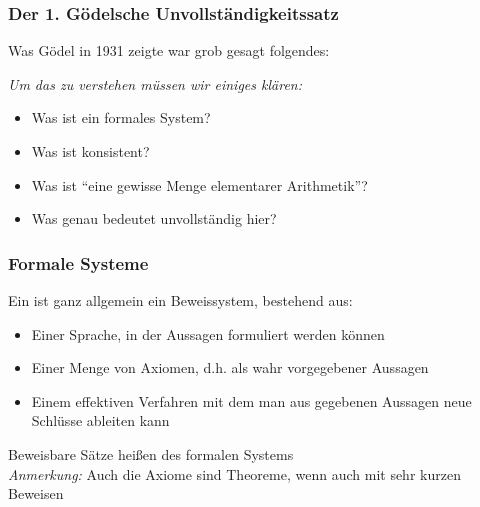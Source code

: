 \documentclass[aspectratio=1610,onlymath]{beamer}
\begin{document}
\maketitle




\begin{frame}\frametitle{Der 1. Gödelsche Unvollständigkeitssatz}

Was Gödel in 1931 zeigte war grob gesagt folgendes:\medskip

\bigskip

\emph{Um das zu verstehen müssen wir einiges klären:}
\begin{itemize}
\item Was ist ein \alert{formales System}?
\item Was ist \alert{konsistent}?
\item Was ist \alert{"`eine gewisse Menge elementarer Arithmetik"'}?
\item Was genau bedeutet \alert{unvollständig} hier?
\end{itemize}

\end{frame}

\begin{frame}\frametitle{Formale Systeme}

Ein  ist ganz allgemein ein Beweissystem, bestehend aus:
\begin{itemize}
\item Einer Sprache, in der Aussagen formuliert werden können
\item Einer Menge von Axiomen, d.h. als wahr vorgegebener Aussagen
\item Einem effektiven Verfahren mit dem man aus gegebenen Aussagen neue Schlüsse ableiten kann
\end{itemize}
Beweisbare Sätze heißen  des formalen Systems\\
{\tiny {\emph{Anmerkung:} Auch die Axiome sind Theoreme, wenn auch mit sehr kurzen Beweisen}}
\medskip\pause




\end{frame}
\end{document}
